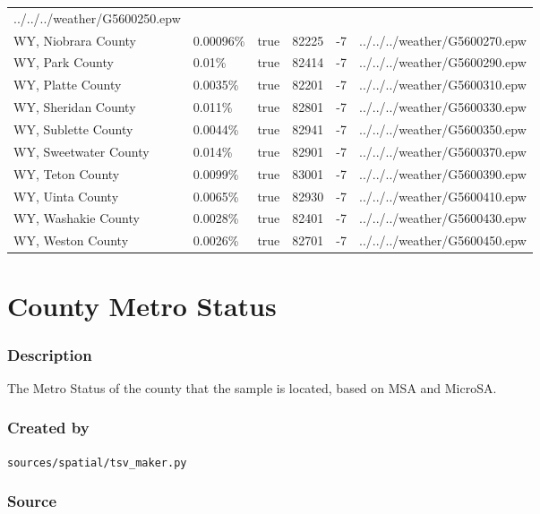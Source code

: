 \begin{longtable}[]{@{}llllll@{}}
../../../weather/G5600250.epw \\
WY, Niobrara County & 0.00096\% & true & 82225 & -7 &
../../../weather/G5600270.epw \\
WY, Park County & 0.01\% & true & 82414 & -7 &
../../../weather/G5600290.epw \\
WY, Platte County & 0.0035\% & true & 82201 & -7 &
../../../weather/G5600310.epw \\
WY, Sheridan County & 0.011\% & true & 82801 & -7 &
../../../weather/G5600330.epw \\
WY, Sublette County & 0.0044\% & true & 82941 & -7 &
../../../weather/G5600350.epw \\
WY, Sweetwater County & 0.014\% & true & 82901 & -7 &
../../../weather/G5600370.epw \\
WY, Teton County & 0.0099\% & true & 83001 & -7 &
../../../weather/G5600390.epw \\
WY, Uinta County & 0.0065\% & true & 82930 & -7 &
../../../weather/G5600410.epw \\
WY, Washakie County & 0.0028\% & true & 82401 & -7 &
../../../weather/G5600430.epw \\
WY, Weston County & 0.0026\% & true & 82701 & -7 &
../../../weather/G5600450.epw \\
\end{longtable}

\section{County Metro Status}\label{county_metro_status}

\subsubsection{Description}\label{description-28}

The Metro Status of the county that the sample is located, based on MSA
and MicroSA.

\subsubsection{Created by}\label{created-by-28}

\texttt{sources/spatial/tsv\_maker.py}

\subsubsection{Source}\label{source-28}


